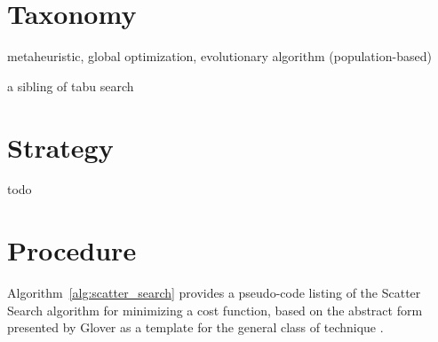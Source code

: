 \documentclass[a4paper, 11pt]{article}
\begin{document}
\section{Taxonomy}
\label{sec:taxonomy}
metaheuristic, global optimization, evolutionary algorithm (population-based)

a sibling of tabu search 


\section{Strategy}
\label{sec:strategy}
todo

\section{Procedure}
\label{sec:procedure}
Algorithm~\ref{alg:scatter_search} provides a pseudo-code listing of the Scatter Search algorithm for minimizing a cost function, based on the abstract form presented by Glover as a template for the general class of technique \cite{Glover1998a}.
\end{document}
